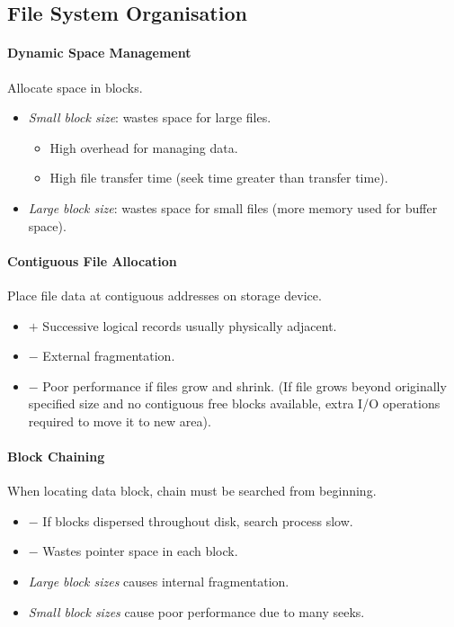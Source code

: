 \documentclass[twocolumn,english]{article}
\begin{document}
\subsection{File System Organisation}

\paragraph{Dynamic Space Management}

Allocate space in blocks.
\begin{itemize}
\item \emph{Small block size}: wastes space for large files.
\begin{itemize}
\item High overhead for managing data.
\item High file transfer time (seek time greater than transfer time).
\end{itemize}
\item \emph{Large block size}: wastes space for small files (more memory
used for buffer space).
\end{itemize}

\paragraph{Contiguous File Allocation}

Place file data at contiguous addresses on storage device.
\begin{itemize}
\item $+$ Successive logical records usually physically adjacent.
\item $-$ External fragmentation.
\item $-$ Poor performance if files grow and shrink. (If file grows beyond
originally specified size and no contiguous free blocks available,
extra I/O operations required to move it to new area).
\end{itemize}

\paragraph{Block Chaining}

When locating data block, chain must be searched from beginning.
\begin{itemize}
\item $-$ If blocks dispersed throughout disk, search process slow.
\item $-$ Wastes pointer space in each block.
\item \emph{Large block sizes} causes internal fragmentation.
\item \emph{Small block sizes} cause poor performance due to many seeks.
\end{itemize}
\end{document}
